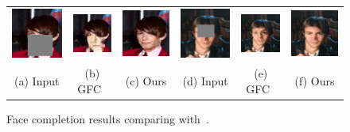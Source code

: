 \begin{figure}[h!]
\begin{tabular}{cccccc}
\includegraphics[width=.16\textwidth]{figures/face/000197_input_image.jpg}&
\includegraphics[width=.16\textwidth]{figures/face/res3/res.jpg}&
\includegraphics[width=.16\textwidth]{figures/face/000197_synthesized_image.jpg}&
\includegraphics[width=.16\textwidth]{figures/face/000200_input_image.jpg}&
\includegraphics[width=.16\textwidth]{figures/face/res4/res.jpg}&
\includegraphics[width=.16\textwidth]{figures/face/000200_synthesized_image.jpg}\\
(a) Input & (b) GFC~\cite{li2017generative} & (c) Ours & (d) Input & (e) GFC~\cite{li2017generative} & (f) Ours \\
\end{tabular}
\caption{Face completion results comparing with~\cite{li2017generative}.}
\label{fig:face}
\vspace{-10pt}
\end{figure}  

